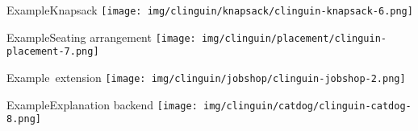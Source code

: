 \begin{frame}[c]{Example}{Knapsack}
  \centering
  \texttt{[image: img/clinguin/knapsack/clinguin-knapsack-6.png]}
\end{frame}
\begin{frame}[c]{Example}{Seating arrangement}
  \centering
  \texttt{[image: img/clinguin/placement/clinguin-placement-7.png]}%
\end{frame}
\begin{frame}[c]{Example}{\clingodl\ extension}
\centering
\texttt{[image: img/clinguin/jobshop/clinguin-jobshop-2.png]}%
\end{frame}
\begin{frame}[c]{Example}{Explanation backend}
\centering
\texttt{[image: img/clinguin/catdog/clinguin-catdog-8.png]}%
\end{frame}
